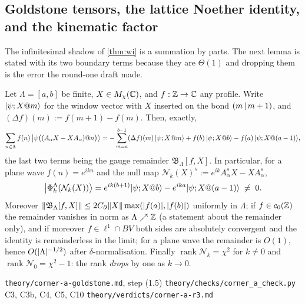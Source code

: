 \subsection{Goldstone tensors, the lattice Noether identity, and the kinematic factor}

The infinitesimal shadow of \cref{thm:wi} is a summation by parts.  The next
lemma is stated with its two boundary terms because they are $\Theta(1)$ and
dropping them is the error the round-one draft made.

\begin{lemma}
\label{thm:lemma-sbp}
Let $\Lambda=[a,b]$ be finite, $X\in M_\chi(\mathbb{C})$, and $f:\mathbb{Z}\to\mathbb{C}$ any profile.
Write $|\psi;X@m\rangle$ for the window vector with $X$ inserted on the bond
$(m\,|\,m+1)$, and $(\Delta f)(m):=f(m+1)-f(m)$.  Then, exactly,
\begin{equation}
  \sum_{n\in\Lambda} f(n)\,\bigl|\psi\bigl((A_\alpha X-XA_\alpha)@n\bigr)\bigr\rangle
  = -\sum_{m=a}^{b-1}(\Delta f)(m)\,|\psi;X@m\rangle
    + f(b)\,|\psi;X@b\rangle - f(a)\,|\psi;X@(a-1)\rangle,
  \label{eq:SBP}
\end{equation}
the last two terms being the gauge remainder $\mathfrak{B}_\Lambda[f,X]$.  In
particular, for a plane wave $f(n)=e^{ikn}$ and the null map
$\mathcal{N}_k(X)^s:=e^{ik}A_\alpha^sX-XA_\alpha^s$,
\begin{equation}
  \bigl|\Phi^\Lambda_k(\mathcal{N}_k(X))\bigr\rangle
  = e^{ik(b+1)}|\psi;X@b\rangle - e^{ika}|\psi;X@(a-1)\rangle
  \;\neq\;0 .
  \label{eq:null-remainder}
\end{equation}
Moreover $\lVert \mathfrak{B}_\Lambda[f,X]\rVert\le 2C_\partial\lVert X\rVert\max(\lvert f(a)\rvert,\lvert f(b)\rvert)$
uniformly in $\Lambda$; if $f\in c_0(\mathbb{Z})$ the remainder vanishes in norm as
$\Lambda\nearrow\mathbb{Z}$ (a statement about the remainder only), and if moreover
$f\in\ell^1\cap BV$ both sides are absolutely convergent and the identity is
remainderless in the limit; for a plane wave the remainder is $O(1)$, hence
$O(\lvert \Lambda\rvert^{-1/2})$ after $\delta$-normalisation.  Finally
$\operatorname{rank}\mathcal{N}_k=\chi^2$ for $k\neq0$ and
$\operatorname{rank}\mathcal{N}_0=\chi^2-1$: the rank \emph{drops} by one as
$k\to0$.
\end{lemma}

%
{\texttt{theory/corner-a-goldstone.md}, step (1.5)}%
{\texttt{theory/checks/corner\_a\_check.py} C3, C3b, C4, C5, C10}%
{\texttt{theory/verdicts/corner-a-r3.md}}

